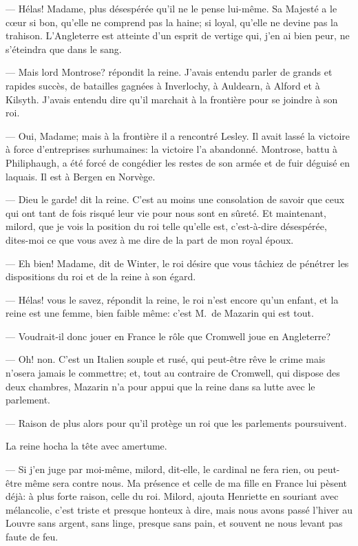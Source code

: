 — Hélas! Madame, plus désespérée qu'il ne le pense lui-même. Sa Majesté a le cœur si bon, qu'elle ne comprend pas la haine; si loyal, qu'elle ne devine pas la trahison. L'Angleterre est atteinte d'un esprit de vertige qui, j'en ai bien peur, ne s'éteindra que dans le sang.

— Mais lord Montrose? répondit la reine. J'avais entendu parler de grands et rapides succès, de batailles gagnées à Inverlochy, à Auldearn, à Alford et à Kilsyth. J'avais entendu dire qu'il marchait à la frontière pour se joindre à son roi.

— Oui, Madame; mais à la frontière il a rencontré Lesley. Il avait lassé la victoire à force d'entreprises surhumaines: la victoire l'a abandonné. Montrose, battu à Philiphaugh, a été forcé de congédier les restes de son armée et de fuir déguisé en laquais. Il est à Bergen en Norvège.

— Dieu le garde! dit la reine. C'est au moins une consolation de savoir que ceux qui ont tant de fois risqué leur vie pour nous sont en sûreté. Et maintenant, milord, que je vois la position du roi telle qu'elle est, c'est-à-dire désespérée, dites-moi ce que vous avez à me dire de la part de mon royal époux.

— Eh bien! Madame, dit de Winter, le roi désire que vous tâchiez de pénétrer les dispositions du roi et de la reine à son égard.

— Hélas! vous le savez, répondit la reine, le roi n'est encore qu'un enfant, et la reine est une femme, bien faible même: c'est M.~de Mazarin qui est tout.

— Voudrait-il donc jouer en France le rôle que Cromwell joue en Angleterre?

— Oh! non. C'est un Italien souple et rusé, qui peut-être rêve le crime mais n'osera jamais le commettre; et, tout au contraire de Cromwell, qui dispose des deux chambres, Mazarin n'a pour appui que la reine dans sa lutte avec le parlement.

— Raison de plus alors pour qu'il protège un roi que les parlements poursuivent.

La reine hocha la tête avec amertume.

— Si j'en juge par moi-même, milord, dit-elle, le cardinal ne fera rien, ou peut-être même sera contre nous. Ma présence et celle de ma fille en France lui pèsent déjà: à plus forte raison, celle du roi. Milord, ajouta Henriette en souriant avec mélancolie, c'est triste et presque honteux à dire, mais nous avons passé l'hiver au Louvre sans argent, sans linge, presque sans pain, et souvent ne nous levant pas faute de feu.

